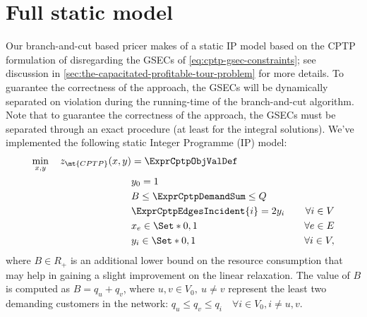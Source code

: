 \section{Full static model}
\label{sec:impl-full-static-model}

Our branch-and-cut based pricer makes of a static IP model
based on the CPTP formulation of 
disregarding the GSECs of \cref{eq:cptp-gsec-constraints};
see discussion in \cref{sec:the-capacitated-profitable-tour-problem} for more details.
To guarantee the correctness of the approach,
the GSECs will be dynamically separated on violation
during the running-time of the branch-and-cut algorithm.
Note that to guarantee the correctness of the approach,
the GSECs must be separated through an exact procedure
(at least for the integral solutions).
We've implemented the following static Integer Programme (IP) model:
\begin{align}
	\min_{x,y} \quad z_\mt{CPTP}(x, y) & = \ExprCptpObjValDef                     & \label{eq:cptp-static-model-0}                         \\
	                                   & y_0 = 1                                  & \label{eq:cptp-static-model-1}                         \\
	                                   & B \le   \ExprCptpDemandSum   \le Q       & \label{eq:cptp-static-model-2}                         \\
	                                   & \ExprCptpEdgesIncident{i}    = 2 y_i     & \quad \forall i \in V  \label{eq:cptp-static-model-3}  \\
	                                   & x_{e}                   \in \Set*{0, 1}  & \quad \forall e \in E  \label{eq:cptp-static-model-4}  \\
	                                   & y_{i}                    \in \Set*{0, 1} & \quad \forall i \in V  \label{eq:cptp-static-model-5},
\end{align}
where
$B \in R_+$ is an additional lower bound on the resource consumption
that may help in gaining a slight improvement on the linear relaxation.
The value of $B$ is computed as $B = q_u + q_v$, where $u, v \in V_0,\ u \ne v$
represent the least two demanding customers in the network:
$q_u \le q_v \le q_i \quad \forall i \in V_0, i \ne u, v$.

